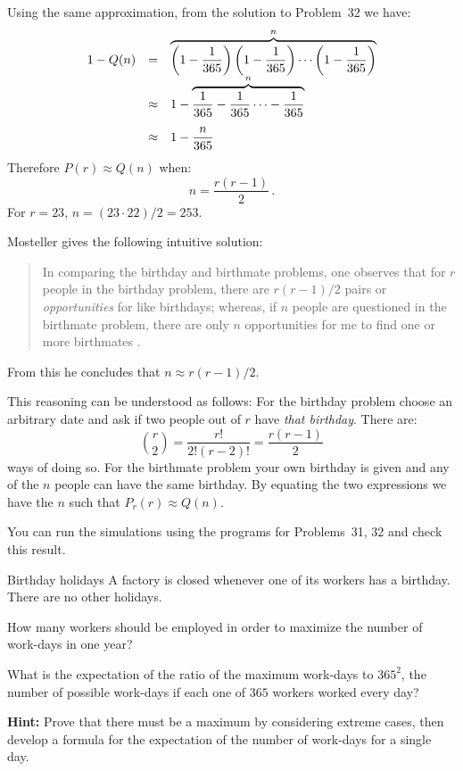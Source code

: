 Using the same approximation, from the solution to Problem~$32$ we have:
\[
\renewcommand*{\arraystretch}{2.2}
\begin{array}{lcl}
1-Q(n)
&=&\overbrace{\left(1-\frac{1}{365}\right)
  \left(1-\frac{1}{365}\right)\cdots
  \left(1-\frac{1}{365}\right)}^{n}\\
&\approx& 1-\overbrace{\frac{1}{365}-\frac{1}{365}\cdots-
  \frac{1}{365}}^{n}\\
&\approx& 1-\disfrac{n}{365}\\
\end{array}
\]
Therefore $P(r)\approx Q(n)$ when:
\[
n=\frac{r(r-1)}{2}\,.
\]
For $r=23$, $n=(23\cdot 22)/2=253$.


Mosteller gives the following intuitive solution:
\begin{quote}
In comparing the birthday and birthmate problems, one observes that for $r$ people in the birthday problem, there are $r(r-1)/2$ pairs or \emph{opportunities} for like birthdays; whereas, if $n$ people are questioned in the birthmate problem, there are only $n$ opportunities for me to find one or more birthmates \cite[p.~322]{birthday}.
\end{quote}
From this he concludes that $n\approx r(r-1)/2$.

This reasoning can be understood as follows: For the birthday problem choose an arbitrary date and ask if two people out of $r$ have \emph{that birthday}. There are:
\[
{r \choose 2}=\frac{r!}{2!(r-2)!} = \frac{r(r-1)}{2}
\]
ways of doing so. For the birthmate problem your own birthday is given and any of the $n$ people can have the same birthday. By equating the two expressions we have the $n$ such that $P_r(r) \approx Q(n)$.

\medskip

\sml{}

You can run the simulations using the programs for Problems~31, 32 and check this result.


\begin{prob}{Birthday holidays}
A factory is closed whenever one of its workers has a birthday. There are no other holidays.

 How many workers should be employed in order to maximize the number of work-days in one year?

 What is the expectation of the ratio of the maximum work-days to $365^2$, the number of possible work-days if each one of $365$ workers worked every day?

\textbf{Hint:} Prove that there must be a maximum by considering extreme cases, then develop a formula for the expectation of the number of work-days for a single day.
\end{prob}


